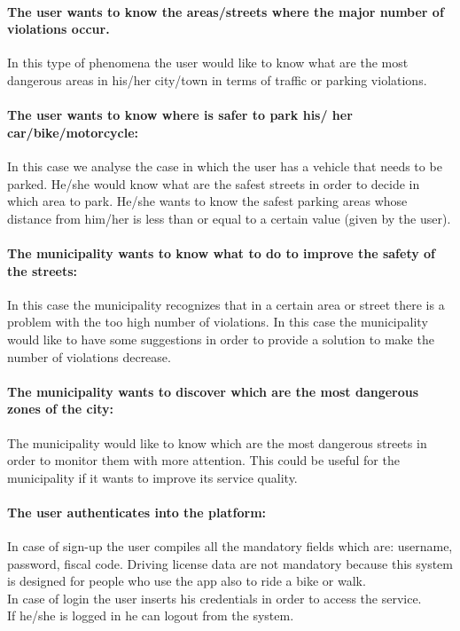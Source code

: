 \documentclass[titlepage]{article}
\begin{document}
\paragraph{The user wants to know the areas/streets where the 
	      major number of violations occur.}
In this type of phenomena the user would like to know what are the most dangerous areas in his/her city/town in terms of traffic or parking violations. 
\paragraph{The user wants to know where is safer to park his/			  her car/bike/motorcycle:}
In this case we analyse the case in which the user has a vehicle that needs to be parked. He/she would know what are the safest streets in order to decide in which area to park. He/she wants to know the safest parking areas whose distance from him/her is less than or equal to a certain value (given by the user).
\paragraph{The municipality wants to know what to do to 				improve the safety of the streets: }
In this case the municipality recognizes that in a certain area or street there is a problem with the too high number of violations. In this case the municipality would like to have some suggestions in order to provide a solution to make the number of violations decrease.
\paragraph{The municipality wants to discover which are the most dangerous zones of the city: }
The municipality would like to know which are the most dangerous streets in order to monitor them with more attention. This could be useful for the municipality if it wants to improve its service quality.
\paragraph{The user authenticates into the platform: }
In case of sign-up the user compiles all the mandatory fields which are: username, password, fiscal code. Driving license data are not mandatory because this system is designed for people who use the app also to ride a bike or walk. \\
In case of login the user inserts his credentials in order to access the service. \\
If he/she is logged in he can logout from the system.
\end{document}
